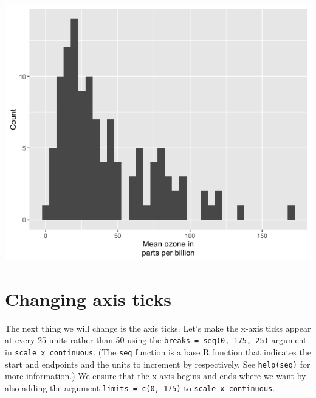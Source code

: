 \begin{center}\includegraphics[width=0.55\linewidth]{0_all_posts_pdf/histogram_6-1} \end{center}

\section{Changing axis ticks}\label{changing-axis-ticks}

The next thing we will change is the axis ticks. Let's make the x-axis
ticks appear at every 25 units rather than 50 using the
\texttt{breaks\ =\ seq(0,\ 175,\ 25)} argument in
\texttt{scale\_x\_continuous}. (The \texttt{seq} function is a base R
function that indicates the start and endpoints and the units to
increment by respectively. See \texttt{help(seq)} for more information.)
We ensure that the x-axis begins and ends where we want by also adding
the argument \texttt{limits\ =\ c(0,\ 175)} to
\texttt{scale\_x\_continuous}.

\begin{Shaded}
\begin{Highlighting}[]
\StringTok{ }\NormalTok{(} \StringTok{ }
\StringTok{      }\NormalTok{(}\NormalTok{(}  \NormalTok{) +}
\StringTok{      }\NormalTok{(} \NormalTok{,}
\StringTok{        } \NormalTok{(}\NormalTok{, }\NormalTok{, }\NormalTok{),}
\StringTok{        }\NormalTok{(}\NormalTok{, }\NormalTok{)) +}
\StringTok{      }\NormalTok{(} \NormalTok{)}
\end{Highlighting}
\end{Shaded}

